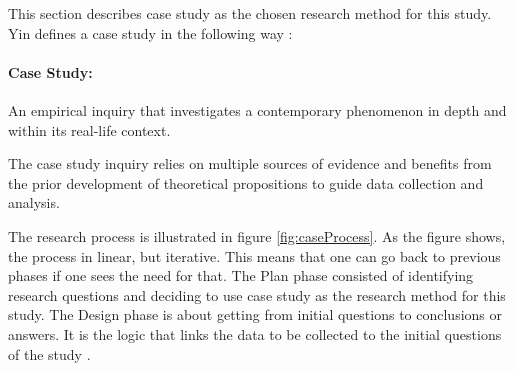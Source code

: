 This section describes case study as the chosen research method for this study. Yin defines a case study in the following way \cite{CaseStudyResearch}:

\paragraph{Case Study:} An empirical inquiry that investigates a contemporary phenomenon in depth and within its real-life context.


The case study inquiry relies on multiple sources of evidence and benefits from the prior development of theoretical propositions to guide data collection and analysis.

The research process is illustrated in figure \ref{fig:caseProcess}. As the figure shows, the process in linear, but iterative. This means that one can go back to previous phases if one sees the need for that. The Plan phase consisted of identifying research questions and deciding to use case study as the research method for this study. The Design phase is about getting from initial questions to conclusions or answers. It is the logic that links the data to be collected to the initial questions of the study \cite{CaseStudyResearch}. 

